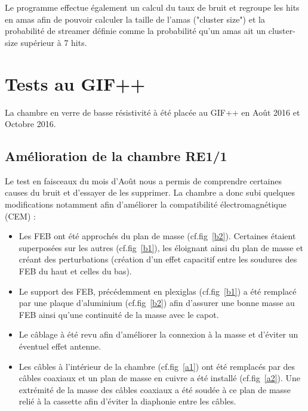 Le programme effectue également un calcul du taux de bruit et regroupe les hits en amas afin de pouvoir calculer la taille de l'amas ("cluster size") et la probabilité de streamer définie comme la probabilité qu'un amas ait un cluster-size supérieur à 7 hits.

\section{Tests au GIF++}
\vspace{-0.3cm}
La chambre en verre de basse résistivité à été placée au GIF++ en Août 2016 et Octobre 2016.
\vspace{-0.3cm}
\subsection{Amélioration de la chambre RE1/1}
\vspace{-0.3cm}
Le test en faisceaux du mois d'Août nous a permis de comprendre certaines causes du bruit et d'essayer de les supprimer.
La chambre a donc subi quelques modifications notamment afin d'améliorer la compatibilité électromagnétique (CEM) \cite{charoy2012comp}:

\begin{itemize}[label=$\bullet$]
	\item Les FEB ont été approchés du plan de masse (cf.fig~\ref{b2}). Certaines étaient superposées sur les autres (cf.fig~\ref{b1}), les éloignant ainsi du plan de masse et créant des perturbations (création d'un effet capacitif entre les soudures des FEB du haut et celles du bas).
	\item Le support des FEB, précédemment en plexiglas (cf.fig~\ref{b1}) a été remplacé par une plaque d'aluminium (cf.fig~\ref{b2}) afin d'assurer une bonne masse au FEB ainsi qu'une continuité de la masse avec le capot.
	\item Le câblage à été revu afin d'améliorer la connexion à la masse et d'éviter un éventuel effet antenne.
	\item Les câbles à l'intérieur de la chambre (cf.fig~\ref{a1}) ont été remplacés par des câbles coaxiaux et un plan de masse en cuivre a été installé (cf.fig~\ref{a2}). Une extrémité de la masse des câbles coaxiaux a été soudée à ce plan de masse relié à la cassette afin d'éviter la diaphonie entre les câbles.
\end{itemize}


